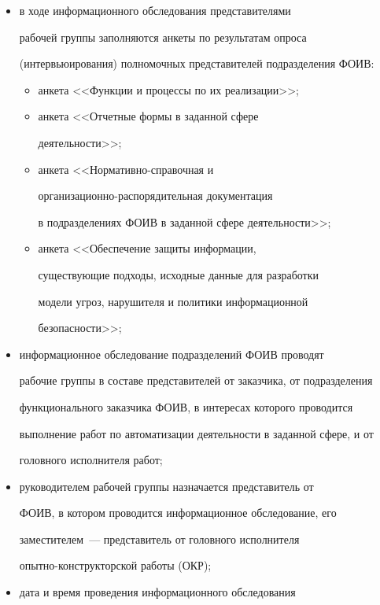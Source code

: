 \begin{itemize}
      \item в ходе информационного обследования представителями 


рабочей группы заполняются анкеты по результатам опроса 


(интервьюирования) полномочных представителей подразделения ФОИВ:


      \begin{itemize}


\item анкета <<Функции и процессы по их реализации>>;


\item анкета <<Отчетные формы в заданной сфере 


деятельности>>;


\item анкета <<Нормативно-справочная и 


орга\-ни\-за\-ци\-он\-но-рас\-по\-ря\-ди\-тель\-ная документация 


в подразделениях ФОИВ в заданной сфере деятель\-ности>>;


\item анкета <<Обеспечение защиты информации, 


существующие подходы, исходные данные для разработки 


модели угроз, нарушителя и политики информационной 


безопасности>>;


\end{itemize}


      \item информационное обследование подразделений ФОИВ проводят 


рабочие группы в составе представителей  от заказчика, от подразделения 


функционального заказчика ФОИВ, в интересах которого проводится 


выполнение работ по автоматизации деятельности в заданной сфере, и от 


головного исполнителя работ;  


      \item руководителем рабочей группы назначается представитель от 


ФОИВ, в котором проводится информационное обследование, его 


заместителем~--- представитель от головного исполнителя 


опытно-кон\-ст\-рук\-тор\-ской работы (ОКР);


      \item дата и время проведения информационного обследования 



\end{itemize}
